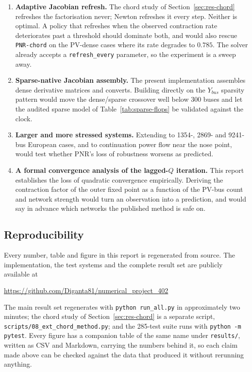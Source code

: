 \documentclass[sigconf,nonacm]{acmart}
\begin{document}
\begin{enumerate}
\item \textbf{Adaptive Jacobian refresh.} The chord study of
      Section~\ref{sec:res-chord} refreshes the factorisation never; Newton
      refreshes it every step. Neither is optimal. A policy that refreshes when
      the observed contraction rate deteriorates past a threshold should
      dominate both, and would also rescue \texttt{PNR-chord} on the PV-dense
      cases where its rate degrades to $0.785$. The solver already accepts a
      \texttt{refresh\_every} parameter, so the experiment is a sweep away.
\item \textbf{Sparse-native Jacobian assembly.} The present implementation
      assembles dense derivative matrices and converts. Building directly on the
      $Y_{bus}$ sparsity pattern would move the dense/sparse crossover well below
      300 buses and let the audited sparse model of
      Table~\ref{tab:sparse-flops} be validated against the clock.
\item \textbf{Larger and more stressed systems.} Extending to 1354-, 2869- and
      9241-bus European cases, and to continuation power flow near the nose
      point, would test whether PNR's loss of robustness worsens as predicted.
\item \textbf{A formal convergence analysis of the lagged-$Q$ iteration.}
      This report establishes the loss of quadratic convergence empirically.
      Deriving the contraction factor of the outer fixed point as a function of
      the PV-bus count and network strength would turn an observation into a
      prediction, and would say in advance which networks the published method
      is safe on.
\end{enumerate}

\subsection{Reproducibility}
Every number, table and figure in this report is regenerated from source. The
implementation, the test systems and the complete result set are publicly
available at

\begin{center}
\url{https://github.com/Diganta81/numerical_project_402}
\end{center}

\noindent The main result set regenerates with \texttt{python run\_all.py} in
approximately two minutes; the chord study of Section~\ref{sec:res-chord} is a
separate script, \texttt{scripts/08\_ext\_chord\_method.py}; and the 285-test
suite runs with \texttt{python -m pytest}. Every figure has a companion table of
the same name under \texttt{results/}, written as CSV and Markdown, carrying the
numbers behind it, so each claim made above can be checked against the data that
produced it without rerunning anything.
\end{document}
